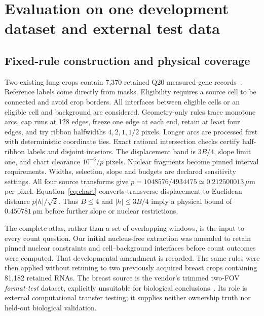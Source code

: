 \documentclass[10pt,letterpaper]{article}
\begin{document}
\section{Evaluation on one development dataset and external test data}\label{sec:eval}
\subsection{Fixed-rule construction and physical coverage}
Two existing lung crops contain 7,370 retained Q20 measured-gene records~\cite{data,xenium}. Reference labels come directly from masks. Eligibility requires a source cell to be connected and avoid crop borders. All interfaces between eligible cells or an eligible cell and background are considered. Geometry-only rules trace monotone arcs, cap runs at 128 edges, freeze one edge at each end, retain at least four edges, and try ribbon halfwidths $4,2,1,1/2$ pixels. Longer arcs are processed first with deterministic coordinate ties. Exact rational intersection checks certify half-ribbon labels and disjoint interiors. The displacement band is $3B/4$, slope limit one, and chart clearance $10^{-6}/p$ pixels. Nuclear fragments become pinned interval requirements. Widths, selection, slope and budgets are declared sensitivity settings. All four source transforms give $p=1048576/4934475\simeq0.212500013\,\mu\mathrm m$ per pixel. Equation~\eqref{eq:chart} converts transverse displacement to Euclidean distance $p|h|/\sqrt2$. Thus $B\le4$ and $|h|\le3B/4$ imply a physical bound of $0.450781\,\mu\mathrm m$ before further slope or nuclear restrictions.

The complete atlas, rather than a set of overlapping windows, is the input to every count question. Our initial nucleus-free extraction was amended to retain pinned nuclear constraints and cell--background interfaces before count outcomes were computed. That developmental amendment is recorded. The same rules were then applied without retuning to two previously acquired breast crops containing 81,182 retained RNAs. The breast source is the vendor's trimmed two-FOV \emph{format-test} dataset, explicitly unsuitable for biological conclusions~\cite{breasttest}. Its role is external computational transfer testing; it supplies neither ownership truth nor held-out biological validation.
\end{document}
